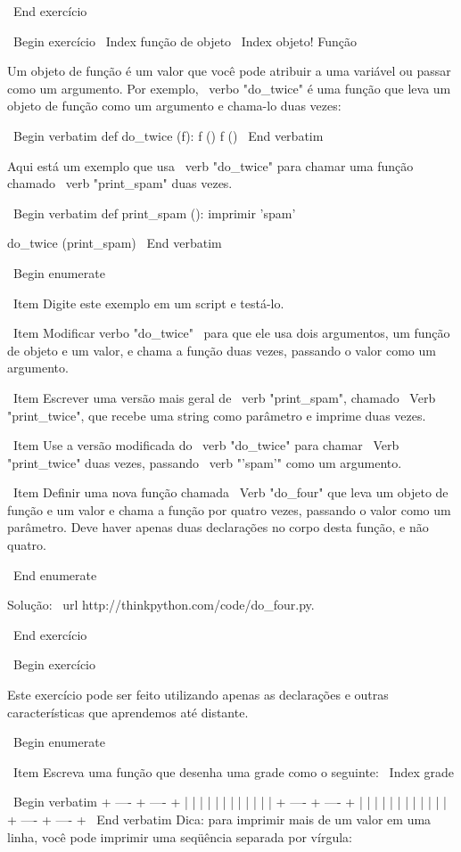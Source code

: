 \documentclass[10pt]{book}
\begin{document}
\begin {itemize}
{\ End {} exercício


\ Begin {} exercício
\ Index {função de objeto}
\ Index {objeto! Função}

Um objeto de função é um valor que você pode atribuir a uma variável
ou passar como um argumento. Por exemplo, \ verbo "do_twice" é uma função
que leva um objeto de função como um argumento e chama-lo duas vezes:

\ Begin {verbatim}
def do_twice (f):
    f ()
    f ()
\ End {verbatim}

Aqui está um exemplo que usa \ verb "do_twice" para chamar uma função
chamado \ verb "print_spam" duas vezes.

\ Begin {verbatim}
def print_spam ():
    imprimir 'spam'

do_twice (print_spam)
\ End {verbatim}

\ Begin {enumerate}

\ Item Digite este exemplo em um script e testá-lo.

\ Item Modificar verbo "do_twice" \ para que ele usa dois argumentos, um
função de objeto e um valor, e chama a função duas vezes,
passando o valor como um argumento.

\ Item Escrever uma versão mais geral de \ verb "print_spam", chamado
\ Verb "print_twice", que recebe uma string como parâmetro e imprime
duas vezes.

\ Item Use a versão modificada do \ verb "do_twice" para chamar
\ Verb "print_twice" duas vezes, passando \ verb "'spam'" como um argumento.

\ Item Definir uma nova função chamada 
\ Verb "do_four" que leva um objeto de função e um valor
e chama a função por quatro vezes, passando o valor
como um parâmetro. Deve haver apenas
duas declarações no corpo desta função, e não quatro.

\ End {enumerate}

Solução: \ url {http://thinkpython.com/code/do_four.py}.

\ End {} exercício



\ Begin {} exercício

Este exercício pode ser
feito utilizando apenas as declarações e outras características que aprendemos até
distante.  

\ Begin {enumerate}

\ Item Escreva uma função que desenha uma grade como o seguinte:
\ Index {grade}

\ Begin {verbatim}
+ ---- + ---- +
| | |
| | |
| | |
| | |
+ ---- + ---- +
| | |
| | |
| | |
| | |
+ ---- + ---- +
\ End {verbatim}
%
Dica: para imprimir mais de um valor em uma linha, você pode imprimir
uma seqüência separada por vírgula:

}
\end{itemize}
\end{document}
